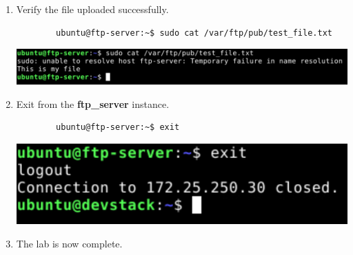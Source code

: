 \documentclass[letterpaper, 12pt]{article}
\begin{document}
\begin{enumerate}
    \item Verify the file uploaded successfully.
    \begin{lstlisting}
        ubuntu@ftp-server:~$ sudo cat /var/ftp/pub/test_file.txt
    \end{lstlisting}

    \begin{center}
        \includegraphics[width=\linewidth]{images/part1/step52.png}
    \end{center}

    \item Exit from the \textbf{ftp\_server} instance.
    \begin{lstlisting}
        ubuntu@ftp-server:~$ exit
    \end{lstlisting}

    \begin{center}
        \includegraphics[width=\linewidth]{images/part1/step53.png}
    \end{center}

    \item The lab is now complete.

\end{enumerate}
\end{document}
